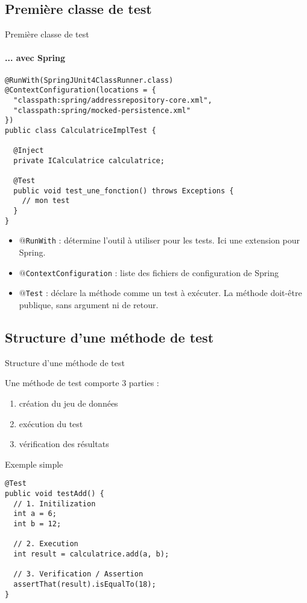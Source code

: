 \documentclass[compress]{beamer}%
\begin{document}
\subsection{Première classe de test}

\begin{frame}[fragile]{Première classe de test}
	\framesubtitle{... avec Spring}
	
	\begin{lstlisting}	
@RunWith(SpringJUnit4ClassRunner.class)
@ContextConfiguration(locations = {
  "classpath:spring/addressrepository-core.xml",
  "classpath:spring/mocked-persistence.xml"
})
public class CalculatriceImplTest {

  @Inject
  private ICalculatrice calculatrice;

  @Test
  public void test_une_fonction() throws Exceptions {
	// mon test
  }
}
	\end{lstlisting}
	
	\pause
	\begin{itemize}[<+->]
	\item \texttt{$@$RunWith} : détermine l'outil à utiliser pour les tests. Ici une extension pour Spring.
	\item \texttt{$@$ContextConfiguration} : liste des fichiers de configuration de Spring
	\item \texttt{$@$Test} : déclare la méthode comme un test à exécuter. La méthode doit-être publique, sans argument ni de retour.
	\end{itemize}

\end{frame}

\subsection{Structure d'une méthode de test}

\begin{frame}[fragile]{Structure d'une méthode de test}

	Une méthode de test comporte 3 parties :
	\begin{enumerate}
	\pause
	\item création du jeu de données
	\pause
	\item exécution du test
	\pause
	\item vérification des résultats
	\end{enumerate}
	
\end{frame}

\begin{frame}[containsverbatim]{Exemple simple}

	\begin{lstlisting}
@Test
public void testAdd() {
  // 1. Initilization
  int a = 6;
  int b = 12;
  
  // 2. Execution
  int result = calculatrice.add(a, b);
  
  // 3. Verification / Assertion
  assertThat(result).isEqualTo(18);
}
	\end{lstlisting}
\end{frame}
\end{document}
